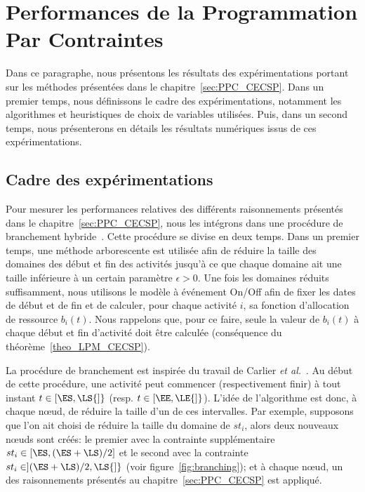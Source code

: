 \section{Performances de la Programmation Par Contraintes}
\label{sec:expe_PPC}
Dans ce paragraphe, nous présentons les résultats des expérimentations
portant sur les méthodes présentées dans le
chapitre~\ref{sec:PPC_CECSP}. Dans un premier temps, nous définissons
le cadre des expérimentations, notamment les algorithmes et
heuristiques de choix de variables utilisées. Puis, dans un second
temps, nous présenterons en détails les résultats numériques issus de
ces expérimentations. 

\subsection{Cadre des expérimentations}
\label{sec:hybridBB}
Pour mesurer les performances relatives des différents raisonnements
présentés dans le chapitre~\ref{sec:PPC_CECSP}, nous les intégrons
dans une procédure de branchement
hybride~\cite{Nattaf_Constraints,Nattaf_ORSpectrum}. Cette procédure
se divise en deux temps. Dans un premier temps, une méthode 
arborescente est utilisée afin de réduire la taille des domaines des
début et fin des activités jusqu'à ce que chaque domaine ait une
taille inférieure à un certain paramètre $\epsilon >0$. Une fois les
domaines réduits suffisamment, nous utilisons le modèle à événement
On/Off afin de fixer les dates de début et de fin et de calculer, pour
chaque activité $i$, sa fonction d'allocation de ressource
$b_i(t)$. Nous rappelons que, pour ce faire, seule la valeur de
$b_i(t)$ à chaque début et fin d'activité doit être calculée
(conséquence du théorème~\ref{theo_LPM_CECSP}).

La procédure de branchement est inspirée du travail de Carlier {\it et
  al.}~\cite{Carlier}. Au début de cette procédure, une activité peut
commencer (respectivement finir) à tout instant $t \in [\ES,\LS{]}$
(resp. $t \in [\EE,\LE{]}$). L'idée de l'algorithme est donc, à chaque
n\oe ud, de réduire la taille d'un de ces intervalles. Par exemple,
supposons que l'on ait choisi de réduire la taille du domaine de
$st_i$, alors deux nouveaux n\oe uds sont créés: le premier avec la
contrainte supplémentaire $st_i \in [\ES , (\ES+\LS) / 2]$ et le
second avec la contrainte $st_i \in ](\ES+\LS) / 2,\LS{]}$ (voir
figure~\ref{fig:branching}); et à chaque n\oe ud, un des raisonnements
présentés au chapitre~\ref{sec:PPC_CECSP} est appliqué.

